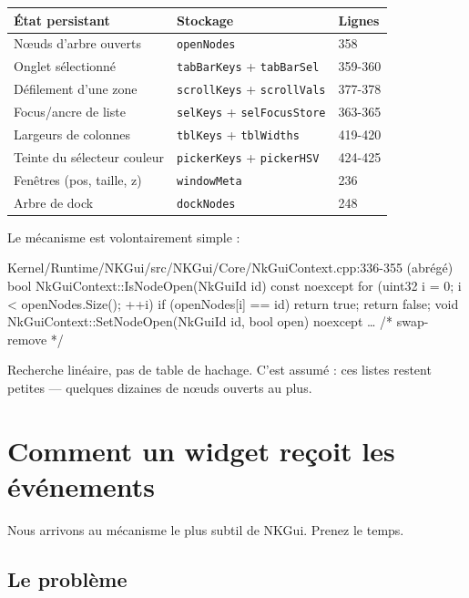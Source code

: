 \begin{center}
\begin{tabular}{@{}lll@{}}
\toprule
\textbf{État persistant} & \textbf{Stockage} & \textbf{Lignes} \\
\midrule
Nœuds d'arbre ouverts       & \texttt{openNodes}                       & 358 \\
Onglet sélectionné          & \texttt{tabBarKeys} + \texttt{tabBarSel}  & 359-360 \\
Défilement d'une zone       & \texttt{scrollKeys} + \texttt{scrollVals} & 377-378 \\
Focus/ancre de liste        & \texttt{selKeys} + \texttt{selFocusStore} & 363-365 \\
Largeurs de colonnes        & \texttt{tblKeys} + \texttt{tblWidths}     & 419-420 \\
Teinte du sélecteur couleur & \texttt{pickerKeys} + \texttt{pickerHSV}  & 424-425 \\
Fenêtres (pos, taille, z)   & \texttt{windowMeta}                       & 236 \\
Arbre de dock               & \texttt{dockNodes}                        & 248 \\
\bottomrule
\end{tabular}
\end{center}

Le mécanisme est volontairement simple :

\begin{nkcode}{Kernel/Runtime/NKGui/src/NKGui/Core/NkGuiContext.cpp:336-355 (abrégé)}
bool NkGuiContext::IsNodeOpen(NkGuiId id) const noexcept {
    for (uint32 i = 0; i < openNodes.Size(); ++i)
        if (openNodes[i] == id) return true;
    return false;
}
void NkGuiContext::SetNodeOpen(NkGuiId id, bool open) noexcept { … /* swap-remove */ }
\end{nkcode}

Recherche linéaire, pas de table de hachage. C'est assumé : ces listes restent
petites — quelques dizaines de nœuds ouverts au plus.

\section{Comment un widget reçoit les événements}

Nous arrivons au mécanisme le plus subtil de NKGui. Prenez le temps.

\subsection{Le problème}

